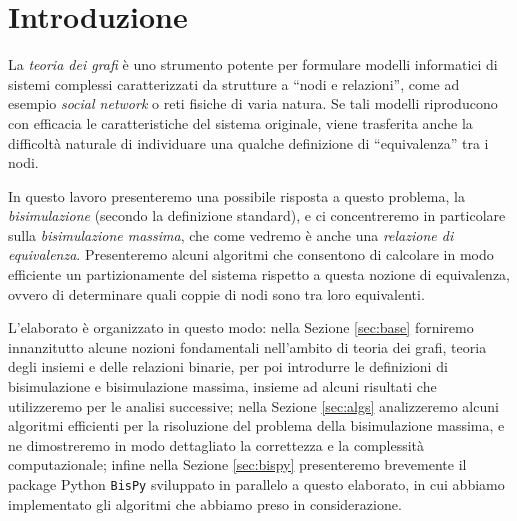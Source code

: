\section{Introduzione}
La \emph{teoria dei grafi} è uno strumento potente per formulare modelli informatici di sistemi complessi caratterizzati da strutture a ``nodi e relazioni'', come ad esempio \emph{social network} o reti fisiche di varia natura. Se tali modelli riproducono con efficacia le caratteristiche del sistema originale, viene trasferita anche la difficoltà naturale di individuare una qualche definizione di ``equivalenza'' tra i nodi.

In questo lavoro presenteremo una possibile risposta a questo problema, la \emph{bisimulazione} (secondo la definizione standard), e ci concentreremo in particolare sulla \emph{bisimulazione massima}, che come vedremo è anche una \emph{relazione di equivalenza}. Presenteremo alcuni algoritmi che consentono di calcolare in modo efficiente un partizionamente del sistema rispetto a questa nozione di equivalenza, ovvero di determinare quali coppie di nodi sono tra loro equivalenti.

L'elaborato è organizzato in questo modo: nella Sezione \ref{sec:base} forniremo innanzitutto alcune nozioni fondamentali nell'ambito di teoria dei grafi, teoria degli insiemi e delle relazioni binarie, per poi introdurre le definizioni di bisimulazione e bisimulazione massima, insieme ad alcuni risultati che utilizzeremo per le analisi successive; nella Sezione \ref{sec:algs} analizzeremo alcuni algoritmi efficienti per la risoluzione del problema della bisimulazione massima, e ne dimostreremo in modo dettagliato la correttezza e la complessità computazionale; infine nella Sezione \ref{sec:bispy} presenteremo brevemente il package Python \texttt{BisPy} sviluppato in parallelo a questo elaborato, in cui abbiamo implementato gli algoritmi che abbiamo preso in considerazione.
